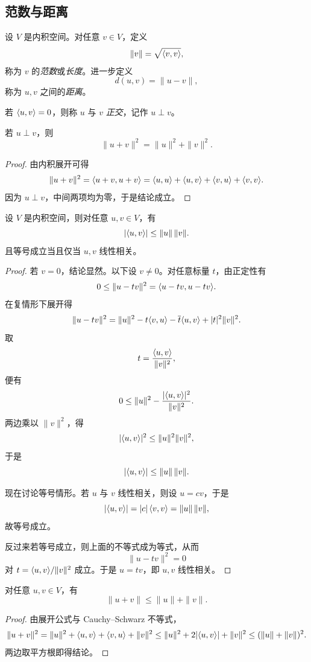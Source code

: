 \subsection{范数与距离}

\begin{definition}
设 $V$ 是内积空间。对任意 $v\in V$，定义
\[
\|v\|=\sqrt{\langle v, v \rangle},
\]
称为 $v$ 的\emph{范数}或\emph{长度}。进一步定义
\[
 d(u,v)=\|u-v\|,
\]
称为 $u,v$ 之间的\emph{距离}。

若 $\langle u, v \rangle=0$，则称 $u$ 与 $v$ \emph{正交}，记作 $u\perp v$。
\end{definition}

\begin{proposition}[勾股恒等式]
若 $u\perp v$，则
\[
\|u+v\|^2=\|u\|^2+\|v\|^2.
\]
\end{proposition}

\begin{proof}
由内积展开可得
\[
\|u+v\|^2=\langle u+v, u+v \rangle=\langle u, u \rangle+\langle u, v \rangle+\langle v, u \rangle+\langle v, v \rangle.
\]
因为 $u\perp v$，中间两项均为零，于是结论成立。
\end{proof}

\begin{theorem}
设 $V$ 是内积空间，则对任意 $u,v\in V$，有
\[
|\langle u, v \rangle|\le \|u\|\,\|v\|.
\]
且等号成立当且仅当 $u,v$ 线性相关。
\end{theorem}

\begin{proof}
若 $v=0$，结论显然。以下设 $v\ne 0$。对任意标量 $t$，由正定性有
\[
0\le \|u-tv\|^2=\langle u-tv, u-tv \rangle.
\]
在复情形下展开得
\[
\|u-tv\|^2=\|u\|^2-t\langle v, u \rangle-\overline{t}\langle u, v \rangle+|t|^2\|v\|^2.
\]
取
\[
t=\frac{\langle u, v \rangle}{\|v\|^2},
\]
便有
\[
0\le \|u\|^2-\frac{|\langle u, v \rangle|^2}{\|v\|^2}.
\]
两边乘以 $\|v\|^2$，得
\[
|\langle u, v \rangle|^2\le \|u\|^2\|v\|^2,
\]
于是
\[
|\langle u, v \rangle|\le \|u\|\,\|v\|.
\]

现在讨论等号情形。若 $u$ 与 $v$ 线性相关，则设 $u=cv$，于是
\[
|\langle u, v \rangle|=|c|\,\langle v, v \rangle=\|u\|\,\|v\|,
\]
故等号成立。

反过来若等号成立，则上面的不等式成为等式，从而
\[
\|u-tv\|^2=0
\]
对 $t=\langle u, v \rangle/\|v\|^2$ 成立。于是 $u=tv$，即 $u,v$ 线性相关。
\end{proof}

\begin{corollary}[三角不等式]
对任意 $u,v\in V$，有
\[
\|u+v\|\le \|u\|+\|v\|.
\]
\end{corollary}

\begin{proof}
由展开公式与 Cauchy--Schwarz 不等式，
\[
\|u+v\|^2=\|u\|^2+\langle u, v \rangle+\langle v, u \rangle+\|v\|^2
\le \|u\|^2+2|\langle u, v \rangle|+\|v\|^2
\le (\|u\|+\|v\|)^2.
\]
两边取平方根即得结论。
\end{proof}

